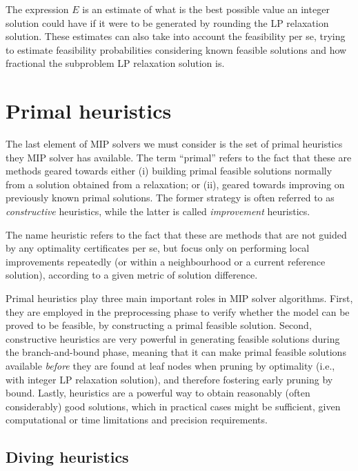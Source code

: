 The expression $E$ is an estimate of what is the best possible value an integer solution could have if it were to be generated by rounding the LP relaxation solution. These estimates can also take into account the feasibility per se, trying to estimate feasibility probabilities considering known feasible solutions and how fractional the subproblem LP relaxation solution is. 



\section{Primal heuristics}
 
The last element of MIP solvers we must consider is the set of primal heuristics they MIP solver has available. The term ``primal'' refers to the fact that these are methods geared towards either (i) building primal feasible solutions normally from a solution obtained from a relaxation; or (ii), geared towards improving on previously known primal solutions. The former strategy is often referred to as \emph{constructive} heuristics, while the latter is called \emph{improvement} heuristics. 

The name heuristic refers to the fact that these are methods that are not guided by any optimality certificates per se, but focus only on performing local improvements repeatedly (or within a neighbourhood or a current reference solution), according to a given metric of solution difference.

Primal heuristics play three main important roles in MIP solver algorithms. First, they are employed in the preprocessing phase to verify whether the model can be proved to be feasible, by constructing a primal feasible solution. Second, constructive heuristics are very powerful in generating feasible solutions during the branch-and-bound phase, meaning that it can make primal feasible solutions available \emph{before} they are found at leaf nodes when pruning by optimality (i.e., with integer LP relaxation solution), and therefore fostering early pruning by bound. Lastly, heuristics are a powerful way to obtain reasonably (often considerably) good solutions, which in practical cases might be sufficient, given computational or time limitations and precision requirements.


\subsection{Diving heuristics}

